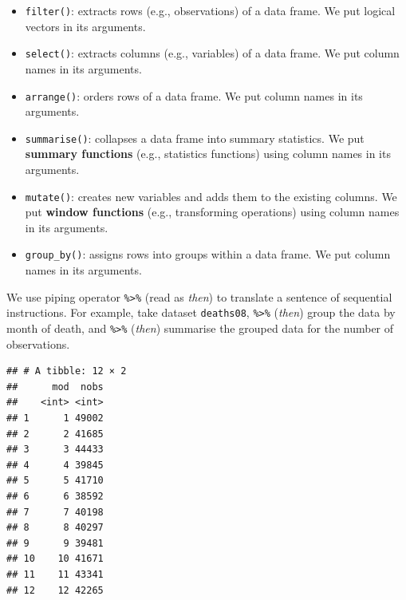 \documentclass[]{book}
\newenvironment{Shaded}{\begin{snugshade}}{\end{snugshade}}
\newcommand{\KeywordTok}[1]{\textcolor[rgb]{0.13,0.29,0.53}{\textbf{{#1}}}}
\newcommand{\DataTypeTok}[1]{\textcolor[rgb]{0.13,0.29,0.53}{{#1}}}
\newcommand{\StringTok}[1]{\textcolor[rgb]{0.31,0.60,0.02}{{#1}}}
\newcommand{\CommentTok}[1]{\textcolor[rgb]{0.56,0.35,0.01}{\textit{{#1}}}}
\newcommand{\NormalTok}[1]{{#1}}
\theoremstyle{definition}
\theoremstyle{definition}
\theoremstyle{remark}
\begin{document}
\begin{itemize}
\item
  \texttt{filter()}: extracts rows (e.g., observations) of a data frame.
  We put logical vectors in its arguments.
\item
  \texttt{select()}: extracts columns (e.g., variables) of a data frame.
  We put column names in its arguments.
\item
  \texttt{arrange()}: orders rows of a data frame. We put column names
  in its arguments.
\item
  \texttt{summarise()}: collapses a data frame into summary statistics.
  We put \textbf{summary functions} (e.g., statistics functions) using
  column names in its arguments.
\item
  \texttt{mutate()}: creates new variables and adds them to the existing
  columns. We put \textbf{window functions} (e.g., transforming
  operations) using column names in its arguments.
\item
  \texttt{group\_by()}: assigns rows into groups within a data frame. We
  put column names in its arguments.
\end{itemize}

We use piping operator \texttt{\%\textgreater{}\%} (read as \emph{then})
to translate a sentence of sequential instructions. For example, take
dataset \texttt{deaths08}, \texttt{\%\textgreater{}\%} (\emph{then})
group the data by month of death, and \texttt{\%\textgreater{}\%}
(\emph{then}) summarise the grouped data for the number of observations.

\begin{Shaded}
\end{Shaded}

\begin{verbatim}
## # A tibble: 12 × 2
##      mod  nobs
##    <int> <int>
## 1      1 49002
## 2      2 41685
## 3      3 44433
## 4      4 39845
## 5      5 41710
## 6      6 38592
## 7      7 40198
## 8      8 40297
## 9      9 39481
## 10    10 41671
## 11    11 43341
## 12    12 42265
\end{verbatim}
\end{document}
